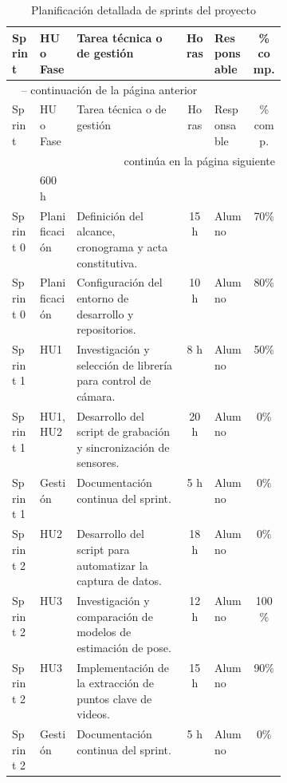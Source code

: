 \documentclass[
11pt, %
]{charter}
\begin{document}
\begin{longtable}{|l|l|p{0.4\linewidth}|c|l|c|}

\caption{Planificación detallada de sprints del proyecto}
\label{tab:sprints} \\

\hline
\rowcolor[HTML]{C0C0C0}
Sprint & HU o Fase & Tarea técnica o de gestión & Horas & Responsable & \% comp. \\
\hline
\endfirsthead

\multicolumn{6}{l}{\tablename\ \thetable{} -- continuación de la página anterior} \\
\hline
\rowcolor[HTML]{C0C0C0}
Sprint & HU o Fase & Tarea técnica o de gestión & Horas & Responsable & \% comp. \\
\hline
\endhead

\hline
\multicolumn{6}{r}{{continúa en la página siguiente}} \\
\endfoot

\hline
\multicolumn{3}{|r|}{Total de horas estimadas} & 600 h & & \\
\hline
\endlastfoot


Sprint 0 & Planificación & Definición del alcance, cronograma y acta constitutiva. & 15 h & Alumno & 70\% \\
Sprint 0 & Planificación & Configuración del entorno de desarrollo y repositorios. & 10 h & Alumno & 80\% \\ \hline

Sprint 1 & HU1 & Investigación y selección de librería para control de cámara. & 8 h & Alumno & 50\% \\
Sprint 1 & HU1, HU2 & Desarrollo del script de grabación y sincronización de sensores. & 20 h & Alumno & 0\% \\
Sprint 1 & Gestión & Documentación continua del sprint. & 5 h & Alumno & 0\% \\ \hline

Sprint 2 & HU2 & Desarrollo del script para automatizar la captura de datos. & 18 h & Alumno & 0\% \\
Sprint 2 & HU3 & Investigación y comparación de modelos de estimación de pose. & 12 h & Alumno & 100\% \\
Sprint 2 & HU3 & Implementación de la extracción de puntos clave de videos. & 15 h & Alumno & 90\% \\
Sprint 2 & Gestión & Documentación continua del sprint. & 5 h & Alumno & 0\% \\ \hline


\end{longtable}
\end{document}
